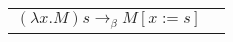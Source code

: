 \documentclass[convert={density=300,size=1080x800,outext=.png}]{standalone}
\begin{document}
\begin{tabular}{l@{ }l}
  $ (\lambda x . M) s \rightarrow_\beta M[x := s] $ \\ 
\end{tabular}
\end{document}

